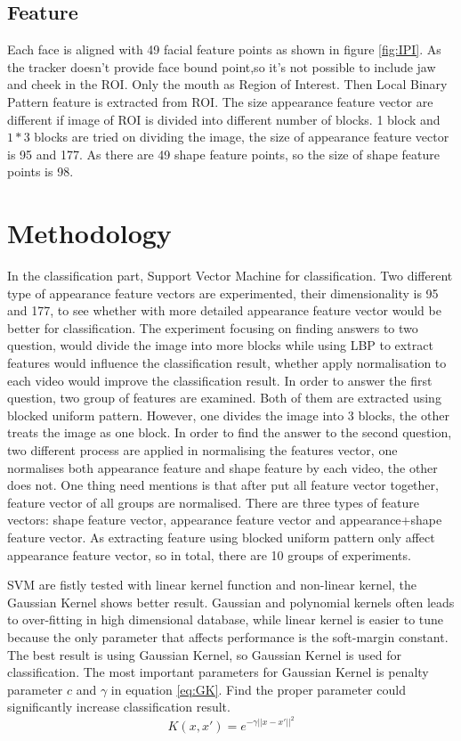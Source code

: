 \subsection{Feature}
Each face is aligned with 49 facial feature points as shown in figure \ref{fig:IPI}. As the tracker doesn't provide face bound point,so it's not possible to include jaw and cheek in the ROI.  Only the mouth as Region of Interest. Then Local Binary Pattern feature is extracted from ROI. The size appearance feature vector are different if image of ROI is divided into different number of blocks. 1 block and $1*3$ blocks are tried on dividing the image, the size of appearance feature vector is 95 and 177. As there are 49 shape feature points, so the size of shape feature points is 98.
\section{Methodology}
In the classification part, Support Vector Machine for classification. Two different type of appearance feature vectors are experimented, their dimensionality is 95 and 177, to see whether with more detailed appearance feature vector would be better for classification. The experiment focusing on finding answers to two question, would divide the image into more blocks while using LBP to extract features would influence the classification result, whether apply normalisation to each video would improve the classification result. In order to answer the first question, two group of features are examined. Both of them are extracted using blocked uniform pattern. However, one divides the image into 3 blocks, the other treats the image as one block. In order to find the answer to the second question, two different process are applied in normalising the features vector, one normalises both appearance feature and shape feature by each video, the other does not. One thing need mentions is that after put all feature vector together, feature vector of all groups are normalised. There are three types of feature vectors: shape feature vector, appearance feature vector and appearance+shape feature vector. As extracting feature using blocked uniform pattern only affect appearance feature vector, so in total, there are 10 groups of experiments.

SVM are fistly tested with linear kernel function and non-linear kernel, the Gaussian Kernel shows better result. Gaussian and polynomial kernels often leads to over-fitting in high dimensional database, while linear kernel is easier to tune because the only parameter that affects performance is the soft-margin constant\cite{ben2010user}. The best result is using Gaussian Kernel, so Gaussian Kernel is used for classification. The most important parameters for Gaussian Kernel is  penalty parameter $c$ and $\gamma$ in equation \ref{eq:GK}. Find the proper parameter could significantly increase classification result.\begin{equation}
K(x,x') = e^{-\gamma||x-x'||^{2}}
\label{eq:GK}
\end{equation}

